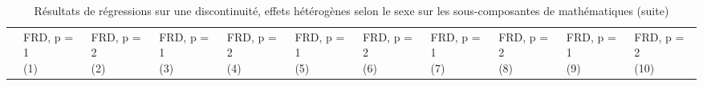 \documentclass[
]{book}
\begin{document}
\begin{ThreePartTable}
\begin{longtable}[t]{lllllllllll}
\midrule
\endfirsthead
\caption[]{\label{tab:agefrdcfhmodelssexessitemsmaths}Résultats de régressions sur une discontinuité, effets hétérogènes selon le sexe sur les sous-composantes de mathématiques (suite)}\\
\toprule
 & \makecell{FRD, p = 1 \\ (1) } & \makecell{FRD, p = 2 \\ (2) } & \makecell{FRD, p = 1 \\ (3) } & \makecell{FRD, p = 2 \\ (4) } & \makecell{FRD, p = 1 \\ (5) } & \makecell{FRD, p = 2 \\ (6) } & \makecell{FRD, p = 1 \\ (7) } & \makecell{FRD, p = 2 \\ (8) } & \makecell{FRD, p = 1 \\ (9) } & \makecell{FRD, p = 2 \\ (10) }\\
\midrule
\endhead


\end{longtable}
\end{ThreePartTable}
\end{document}
